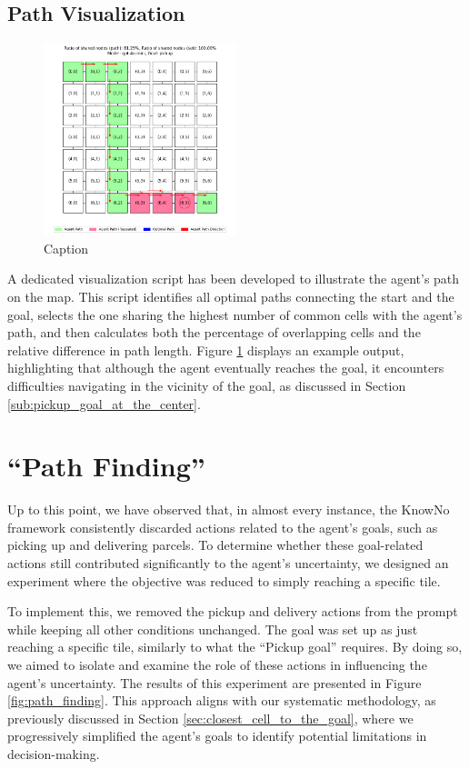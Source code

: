 \subsection{Path Visualization}
\begin{figure}
  \centering
  \includegraphics[width=0.5\textwidth]{
    images/results_discussion/stateful/pickupBR_7x7.png
  }
  \caption{Caption}
  \label{fig:stateful_path}
\end{figure}

A dedicated visualization script has been developed to illustrate the agent's path
on the map. This script identifies all optimal paths connecting the start and
the goal, selects the one sharing the highest number of common cells with the agent's
path, and then calculates both the percentage of overlapping cells and the
relative difference in path length. Figure \ref{fig:stateful_path} displays an example
output, highlighting that although the agent eventually reaches the goal, it encounters
difficulties navigating in the vicinity of the goal, as discussed in Section
\ref{sub:pickup_goal_at_the_center}.
\clearpage

\section{``Path Finding''}

Up to this point, we have observed that, in almost every instance, the KnowNo
framework consistently discarded actions related to the agent's goals, such as picking
up and delivering parcels. To determine whether these goal-related actions still
contributed significantly to the agent's uncertainty, we designed an experiment where
the objective was reduced to simply reaching a specific tile.

To implement this, we removed the pickup and delivery actions from the prompt
while keeping all other conditions unchanged. The goal was set up as just reaching
a specific tile, similarly to what the ``Pickup goal'' requires. By doing so, we
aimed to isolate and examine the role of these actions in influencing the agent's
uncertainty. The results of this experiment are presented in Figure \ref{fig:path_finding}.
This approach aligns with our systematic methodology, as previously discussed in
Section \ref{sec:closest_cell_to_the_goal}, where we progressively simplified
the agent's goals to identify potential limitations in decision-making.

